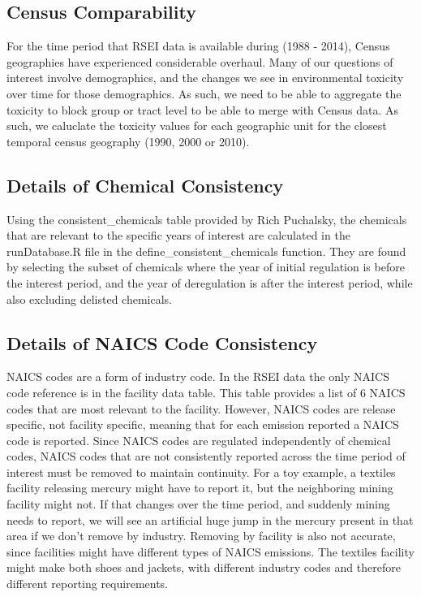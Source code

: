 \documentclass[12pt,twoside]{dukestatscithesis}
\theoremstyle{definition}
\theoremstyle{definition}
\theoremstyle{definition}
\theoremstyle{remark}
\begin{document}
\subsection{Census Comparability}\label{census-comparability}

For the time period that RSEI data is available during (1988 - 2014),
Census geographies have experienced considerable overhaul. Many of our
questions of interest involve demographics, and the changes we see in
environmental toxicity over time for those demographics. As such, we
need to be able to aggregate the toxicity to block group or tract level
to be able to merge with Census data. As such, we caluclate the toxicity
values for each geographic unit for the closest temporal census
geography (1990, 2000 or 2010).

\subsection{Details of Chemical
Consistency}\label{details-of-chemical-consistency}

Using the consistent\_chemicals table provided by Rich Puchalsky, the
chemicals that are relevant to the specific years of interest are
calculated in the runDatabase.R file in the
define\_consistent\_chemicals function. They are found by selecting the
subset of chemicals where the year of initial regulation is before the
interest period, and the year of deregulation is after the interest
period, while also excluding delisted chemicals.

\subsection{Details of NAICS Code
Consistency}\label{details-of-naics-code-consistency}

NAICS codes are a form of industry code. In the RSEI data the only NAICS
code reference is in the facility data table. This table provides a list
of 6 NAICS codes that are most relevant to the facility. However, NAICS
codes are release specific, not facility specific, meaning that for each
emission reported a NAICS code is reported. Since NAICS codes are
regulated independently of chemical codes, NAICS codes that are not
consistently reported across the time period of interest must be removed
to maintain continuity. For a toy example, a textiles facility releasing
mercury might have to report it, but the neighboring mining facility
might not. If that changes over the time period, and suddenly mining
needs to report, we will see an artificial huge jump in the mercury
present in that area if we don't remove by industry. Removing by
facility is also not accurate, since facilities might have different
types of NAICS emissions. The textiles facility might make both shoes
and jackets, with different industry codes and therefore different
reporting requirements.
\end{document}
